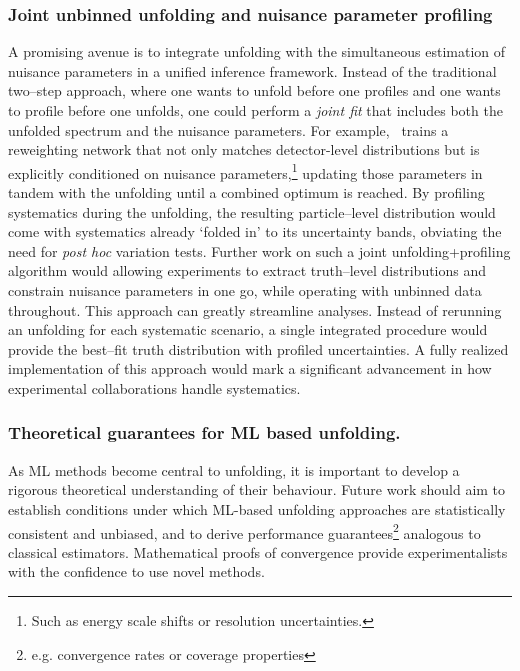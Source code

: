             \subsubsection{Joint unbinned unfolding and nuisance parameter profiling}
                A promising avenue is to integrate unfolding with the simultaneous estimation of nuisance parameters in a unified inference framework.
                Instead of the traditional two--step approach, where one wants to unfold before one profiles and one wants to profile before one unfolds, one could perform a \emph{joint fit} that includes both the unfolded spectrum and the nuisance parameters.
                For example,~\cite{zhu2024multidimensional} trains a reweighting network that not only matches detector-level distributions but is explicitly conditioned on nuisance parameters,\footnote{Such as energy scale shifts or resolution uncertainties.} updating those parameters in tandem with the unfolding until a combined optimum is reached.
                By profiling systematics during the unfolding, the resulting particle--level distribution would come with systematics already `folded in' to its uncertainty bands, obviating the need for \textit{post hoc} variation tests.
                Further work on such a joint unfolding+profiling algorithm would allowing experiments to extract truth--level distributions and constrain nuisance parameters in one go, while operating with unbinned data throughout.
                This approach can greatly streamline analyses.
                Instead of rerunning an unfolding for each systematic scenario, a single integrated procedure would provide the best--fit truth distribution with profiled uncertainties.
                A fully realized implementation of this approach would mark a significant advancement in how experimental collaborations handle systematics.
             \subsubsection{Theoretical guarantees for ML based unfolding.}
                As ML methods become central to unfolding, it is important to develop a rigorous theoretical understanding of their behaviour.
                Future work should aim to establish conditions under which ML-based unfolding approaches are statistically consistent and unbiased, and to derive performance guarantees\footnote{e.g. convergence rates or coverage properties} analogous to classical estimators.
                Mathematical proofs of convergence provide experimentalists with the confidence to use novel methods.
                
